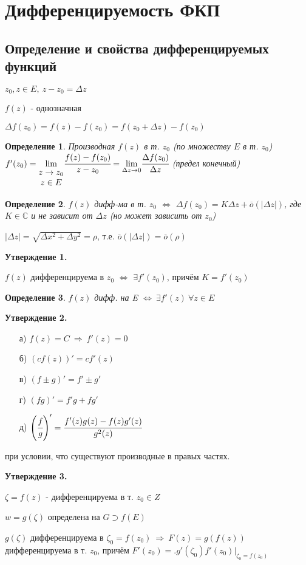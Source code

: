 \documentclass[draft]{report}
\newcommand{\then}{\ \Rightarrow\ }
\renewcommand{\C}{\mathbb{C}}
\newcommand{\mlim}[1]{\underset{#1}{\lim}}
\newcommand{\LRA}{\Leftrightarrow}
\renewcommand{\bar}{\overline}
\newcommand{\D}{\Delta}
\renewcommand{\o}{\bar{o}}
\newcommand{\mat}[1]{\begin{matrix}#1\end{matrix}}
\newcommand{\opr}[1]{\begin{opred}#1\end{opred}}
\newtheorem*{opred}{Определение}
\theoremstyle{remark}
\begin{document}
\section{Дифференцируемость ФКП}

\subsection{Определение и свойства дифференцируемых функций}

$z_0,z\in E,\ z-z_0=\Delta z$

$f(z)$ - однозначная

$\Delta f(z_0)=f(z)-f(z_0)=f(z_0+\Delta z)-f(z_0)$

\opr{Производная $f(z)$ в т. $z_0$ (по множеству $E$ в т. $z_0$) $f'(z_0)=\mlim{\mat{z\to z_0 \\ z\in E}}\cfrac{f(z)-f(z_0)}{z-z_0}=\mlim{\D z\to 0}\cfrac{\D f(z_0)}{\D z}$ (предел конечный)}

\opr{$f(z)$ дифф-ма в т. $z_0$ $\LRA$ $\D f(z_0)=K\D z+\o(|\D z|)$, где $K\in\C$ и не зависит от $\D z$ (но может зависить от $z_0$)}

$|\D z|=\sqrt{\D x^2+\D y^2}=\rho$, т.е. $\overline{o}(|\D z|)=\overline{o}(\rho)$

{\bfseries Утверждение 1.}

$f(z)$ дифференцируема в $z_0$ $\LRA$ $\exists f'(z_0)$, причём $K=f'(z_0)$

\opr{$f(z)$ дифф. на E $\LRA\ \exists f'(z)\ \forall z\in E$ }

{\bfseries Утверждение 2.}
\begin{itemize}
\item[а)] $f(z)=C\then f'(z)=0$
\item[б)] $(cf(z))'=cf'(z)$
\item[в)] $(f\pm g)'=f'\pm g'$
\item[г)] $(fg)'=f'g+fg'$
\item[д)] $\left(\cfrac fg\right)'=\cfrac{f'(z)g(z)-f(z)g'(z)}{g^2(z)}$
\end{itemize} при условии, что существуют производные в правых частях.

{\bfseries Утверждение 3.}

$\zeta=f(z)$ - дифференцируема в т. $z_0\in Z$

$w=g(\zeta)$ определена на $G\supset f(E)$

$g(\zeta)$ дифференцируема в $\zeta_0=f(z_0)\then F(z)=g(f(z))$ дифференцируема в т. $z_0$, причём $F'(z_0)=\bigl.g'(\zeta_0)f'(z_0)\bigr|_{\zeta_0=f(z_0)}$
\end{document}
